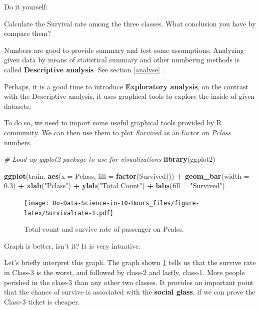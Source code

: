 \documentclass[
]{book}
\makeatletter
\newenvironment{Shaded}{\begin{snugshade}}{\end{snugshade}}
\newcommand{\CommentTok}[1]{\textcolor[rgb]{0.56,0.35,0.01}{\textit{#1}}}
\newcommand{\DataTypeTok}[1]{\textcolor[rgb]{0.13,0.29,0.53}{#1}}
\newcommand{\FloatTok}[1]{\textcolor[rgb]{0.00,0.00,0.81}{#1}}
\newcommand{\KeywordTok}[1]{\textcolor[rgb]{0.13,0.29,0.53}{\textbf{#1}}}
\newcommand{\NormalTok}[1]{#1}
\newcommand{\OperatorTok}[1]{\textcolor[rgb]{0.81,0.36,0.00}{\textbf{#1}}}
\newcommand{\StringTok}[1]{\textcolor[rgb]{0.31,0.60,0.02}{#1}}
\newenvironment{kframe}{%
\medskip{}
\setlength{\fboxsep}{.8em}
 \def\at@end@of@kframe{}%
 \ifinner\ifhmode%
  \def\at@end@of@kframe{\end{minipage}}%
  \begin{minipage}{\columnwidth}%
 \fi\fi%
 \def\FrameCommand##1{\hskip\@totalleftmargin \hskip-\fboxsep
 \colorbox{shadecolor}{##1}\hskip-\fboxsep
     \hskip-\linewidth \hskip-\@totalleftmargin \hskip\columnwidth}%
 \MakeFramed {\advance\hsize-\width
   \@totalleftmargin\z@ \linewidth\hsize
   \@setminipage}}%
 {\par\unskip\endMakeFramed%
 \at@end@of@kframe}
\newenvironment{rmdblock}[1]
  {
  \begin{itemize}
  \renewcommand{\labelitemi}{
    \raisebox{-.7\height}[0pt][0pt]{
      {\setkeys{Gin}{width=3em,keepaspectratio}\texttt{[image: images/\#1]}}
    }
  }
  \setlength{\fboxsep}{1em}
  \begin{kframe}
  \item
  }
  {
  \end{kframe}
  \end{itemize}
  }
\newenvironment{rmdaction}
  {\begin{rmdblock}{action}}
  {\end{rmdblock}}
\makeatother
\begin{document}
\begin{rmdaction}
Do it yourself:

Calculate the Survival rate among the three classes. What conclusion you have by compare them?
\end{rmdaction}

Numbers are good to provide summary and test some assumptions. Analyzing given data by means of statistical summary and other numbering methods is called \textbf{Descriptive analysis}. See section \ref{analyse} .

Perhaps, it is a good time to introduce \textbf{Exploratory analysis}, on the contrast with the Descriptive analysis, it uses graphical tools to explore the inside of given datasets.

To do so, we need to import some useful graphical tools provided by R community. We can then use them to plot \emph{Survived} as an factor on \emph{Pclass} numbers.

\begin{Shaded}
\begin{Highlighting}[]
\CommentTok{# Load up ggplot2 package to use for visualizations}
\KeywordTok{library}\NormalTok{(ggplot2)}

\KeywordTok{ggplot}\NormalTok{(train, }\KeywordTok{aes}\NormalTok{(}\DataTypeTok{x =}\NormalTok{ Pclass, }\DataTypeTok{fill =} \KeywordTok{factor}\NormalTok{(Survived))) }\OperatorTok{+}
\StringTok{  }\KeywordTok{geom_bar}\NormalTok{(}\DataTypeTok{width =} \FloatTok{0.3}\NormalTok{) }\OperatorTok{+}
\StringTok{  }\KeywordTok{xlab}\NormalTok{(}\StringTok{"Pclass"}\NormalTok{) }\OperatorTok{+}
\StringTok{  }\KeywordTok{ylab}\NormalTok{(}\StringTok{"Total Count"}\NormalTok{) }\OperatorTok{+}
\StringTok{  }\KeywordTok{labs}\NormalTok{(}\DataTypeTok{fill =} \StringTok{"Survived"}\NormalTok{)}
\end{Highlighting}
\end{Shaded}

\begin{figure}
\centering
\texttt{[image: Do-Data-Science-in-10-Hours\_files/figure-latex/Survivalrate-1.pdf]}
\caption{\label{fig:Survivalrate}Total count and survive rate of passenger on Pcalss.}
\end{figure}

Graph is better, isn't it? It is very intuative.

Let's briefly interpret this graph. The graph shown \ref{fig:Survivalrate} tells us that the survive rate in Class-3 is the worst, and followed by class-2 and lastly, class-1. More people perished in the class-3 than any other two classes. It provides an important point that the chance of survive is associated with the \textbf{social glass}, if we can prove the Class-3 ticket is cheaper.
\end{document}

